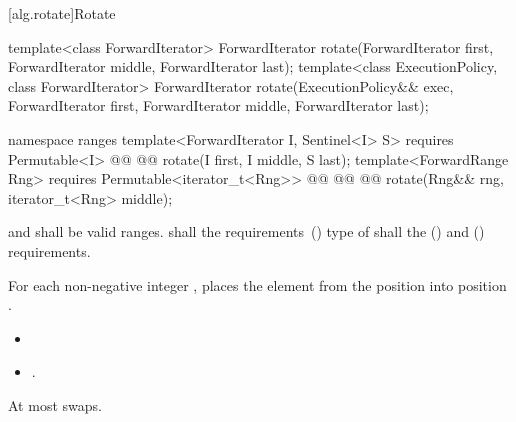 [alg.rotate]{Rotate}


%
\begin{itemdecl}
template<class ForwardIterator>
  ForwardIterator
    rotate(ForwardIterator first, ForwardIterator middle, ForwardIterator last);
template<class ExecutionPolicy, class ForwardIterator>
  ForwardIterator
    rotate(ExecutionPolicy&& exec,
           ForwardIterator first, ForwardIterator middle, ForwardIterator last);
\end{itemdecl}
\begin{addedblock}
\begin{itemdecl}
namespace ranges {
  template<ForwardIterator I, Sentinel<I> S>
    requires Permutable<I>
    @@
    @@
      rotate(I first, I middle, S last);
  template<ForwardRange Rng>
    requires Permutable<iterator_t<Rng>>
    @@
                @@
    @@
      rotate(Rng&& rng, iterator_t<Rng> middle);
}
\end{itemdecl}
\end{addedblock}

\begin{itemdescr}
\pnum
\requires
{}
and
shall be valid ranges.
 shall   the
requirements~() 
type of  shall  
the  () and
 () requirements.

\pnum
\effects
For each non-negative integer
,
places the element from the position
into position
.
\begin{newnewblock}
\begin{note}
\end{note}
\end{newnewblock}

\pnum
\returns
\begin{itemize}
\item {} 
\item {}.
\end{itemize}

\pnum
{}

\pnum
\complexity
At most
swaps.
\end{itemdescr}


